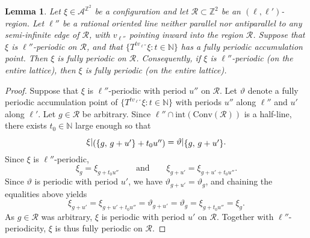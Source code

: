 \documentclass[12pt]{amsart}
\numberwithin{equation}{section}
\newtheorem{lemma}[theorem]{Lemma}
\newcommand{\bb}[1]{\mathbb{#1}}
\newcommand{\sob}[1]{\ensuremath{{\mathbin |}\raise-.4ex\hbox{$#1$}}}
\begin{document}
\begin{lemma}\label{lem:accumulation_fully_periodic}
Let $\xi \in \mathcal{A}^{\mathbb{Z}^2}$ be a configuration and let
$\mathcal{R} \subset \mathbb{Z}^2$ be an $(\pmb{\ell},\pmb{\ell}')$-region.
Let $\pmb{\ell}''$ be a rational oriented line neither parallel nor antiparallel to any semi-infinite edge of $\mathcal{R}$, with $v_{\pmb{\ell}''}$ pointing inward into the region $\mathcal{R}$. Suppose that $\xi$ is $\ell''$-periodic on 
$\mathcal{R}$, and that $\{T^{t v_{\pmb{\ell}''}} \xi : t \in \bb{N}\}$ has a fully periodic accumulation point. Then $\xi$ is fully periodic on $\mathcal{R}$. Consequently, if $\xi$ is $\ell''$-periodic (on the entire lattice), then $\xi$ is fully periodic (on the entire lattice).
\end{lemma}

\begin{proof}
Suppose that $\xi$ is $\ell''$-periodic with period $u''$ on $\mathcal{R} $.
Let $\vartheta$ denote a fully periodic accumulation point of $\{T^{t v_{\pmb{\ell}''}} \xi : t \in \bb{N}\}$
with periods $u''$ along $\ell''$ and $u'$ along $\ell'$.
Let $g \in \mathcal{R}$ be arbitrary. Since $\pmb{\ell}'' \cap \mathrm{int}(\mathrm{Conv}(\mathcal{R}))$ is a
half-line, there exists $t_0 \in \bb{N}$ large enough so that 
\[
\xi\sob{(\{g ,\, g + u' \}+ t_0 u'')}
= \vartheta\sob{\{g,\, g + u'\}}.
\]
Since $\xi$ is $\ell''$-periodic,
\[
\xi_g = \xi_{g + t_0 u''}
\qquad\text{and}\qquad
\xi_{g + u'} = \xi_{g + u' + t_0 u''}.
\]
Since $\vartheta$ is periodic with period $u'$, we have
$\vartheta_{g+u'} = \vartheta_g$, and chaining the equalities above
yields
\[
\xi_{g+u'}
= \xi_{g + u' + t_0 u''}
= \vartheta_{g + u'}
= \vartheta_g
= \xi_{g + t_0 u''}
= \xi_g.
\]
As $g \in \mathcal{R}$ was arbitrary, $\xi$ is periodic with period
$u'$ on $\mathcal{R}$. Together with $\ell''$-periodicity, $\xi$ is
thus fully periodic on $\mathcal{R}$.
\end{proof}
\end{document}
